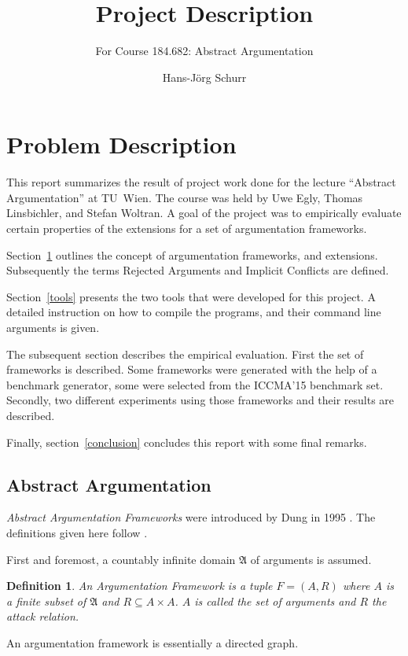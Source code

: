 \documentclass[parskip=half]{scrartcl}
\title{Project Description}
\subtitle{For Course 184.682: Abstract Argumentation}
\author{Hans-Jörg Schurr}
\newtheorem{definition}{Definition}
\begin{document}
\maketitle
\tableofcontents

\section{Problem Description}
\label{problemdesc}
This report summarizes the result of project work done for the lecture
``Abstract Argumentation'' at TU~Wien. The course was held by Uwe Egly, Thomas
Linsbichler, and Stefan Woltran.  A goal of the project was to empirically
evaluate certain properties of the extensions for a set of argumentation
frameworks.

Section~\ref{problemdesc} outlines the concept of argumentation frameworks, and
extensions. Subsequently the terms Rejected Arguments and Implicit Conflicts are
defined.

Section~\ref{tools} presents the two tools that were developed for this project.
A detailed instruction on how to compile the programs, and their command line
arguments is given.

The subsequent section describes the empirical evaluation. First the set of
frameworks is described.  Some frameworks were generated with the help of a
benchmark generator, some were selected from the ICCMA'15 benchmark set.
Secondly, two different experiments using those frameworks and their
results are described.

Finally, section~\ref{conclusion} concludes this report with some final remarks.

\subsection{Abstract Argumentation}
\label{aadef}
\emph{Abstract Argumentation Frameworks} were introduced by Dung in 1995
\cite{dung1995}. The definitions given here follow \cite{baumann2016}.

First and foremost, a countably infinite domain $\mathfrak{A}$ of arguments is
assumed.

\begin{definition}
An \emph{Argumentation Framework} is a tuple $F = (A,R)$ where $A$ is a finite
subset of $\mathfrak{A}$ and $R \subseteq A\times A$.  $A$ is called the set of
arguments and $R$ the attack relation.
\end{definition}
An argumentation framework is essentially a directed graph.
\end{document}
